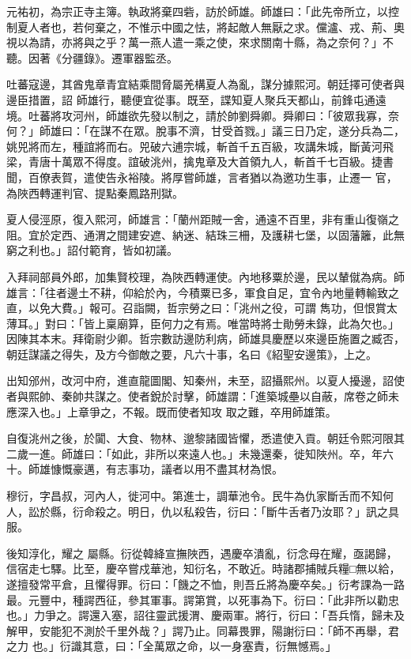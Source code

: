 \begin{pinyinscope}
 元祐初，為宗正寺主簿。執政將棄四砦，訪於師雄。師雄曰：「此先帝所立，以控制夏人者也，若何棄之，不惟示中國之怯，將起敵人無厭之求。儻瀘、戎、荊、奧視以為請，亦將與之乎？萬一燕人遣一乘之使，來求關南十縣，為之奈何？」不聽。因著《分疆錄》。遷軍器監丞。



 吐蕃寇邊，其酋鬼章青宜結乘間脅屬羌構夏人為亂，謀分據熙河。朝廷擇可使者與邊臣措置，詔
 師雄行，聽便宜從事。既至，諜知夏人聚兵天都山，前鋒屯通遠境。吐蕃將攻河州，師雄欲先發以制之，請於帥劉舜卿。舜卿曰：「彼眾我寡，奈何？」師雄曰：「在謀不在眾。脫事不濟，甘受首戮。」議三日乃定，遂分兵為二，姚兕將而左，種誼將而右。兕破六逋宗城，斬首千五百級，攻講朱城，斷黃河飛梁，青唐十萬眾不得度。誼破洮州，擒鬼章及大首領九人，斬首千七百級。捷書聞，百僚表賀，遣使告永裕陵。將厚嘗師雄，言者猶以為邀功生事，止遷一
 官，為陜西轉運判官、提點秦鳳路刑獄。



 夏人侵涇原，復入熙河，師雄言：「蘭州距賊一舍，通遠不百里，非有重山復嶺之阻。宜於定西、通渭之間建安遮、納迷、結珠三柵，及護耕七堡，以固藩籬，此無窮之利也。」詔付範育，皆如初議。



 入拜祠部員外郎，加集賢校理，為陜西轉運使。內地移粟於邊，民以輦僦為病。師雄言：「往者邊土不耕，仰給於內，今積粟已多，軍食自足，宜令內地量轉輸致之直，以免大費。」報可。召詣闕，哲宗勞之曰：「洮州之役，可謂
 雋功，但恨賞太薄耳。」對曰：「皆上稟廟算，臣何力之有焉。唯當時將士勛勞未錄，此為欠也。」因陳其本末。拜衛尉少卿。哲宗數訪邊防利病，師雄具慶歷以來邊臣施置之臧否，朝廷謀議之得失，及方今御敵之要，凡六十事，名曰《紹聖安邊策》，上之。



 出知邠州，改河中府，進直龍圖閣、知秦州，未至，詔攝熙州。以夏人擾邊，詔使者與熙帥、秦帥共謀之。使者銳於討擊，師雄謂：「進築城壘以自蔽，席卷之師未應深入也。」上章爭之，不報。既而使者知攻
 取之難，卒用師雄策。



 自復洮州之後，於闐、大食、物林、邈黎諸國皆懼，悉遣使入貢。朝廷令熙河限其二歲一進。師雄曰：「如此，非所以來遠人也。」未幾還秦，徙知陜州。卒，年六十。師雄慷慨豪邁，有志事功，議者以用不盡其材為恨。



 穆衍，字昌叔，河內人，徙河中。第進士，調華池令。民牛為仇家斷舌而不知何人，訟於縣，衍命殺之。明日，仇以私殺告，衍曰：「斷牛舌者乃汝耶？」訊之具服。



 後知淳化，耀之
 屬縣。衍從韓絳宣撫陜西，遇慶卒潰亂，衍念母在耀，亟謁歸，信宿走七驛。比至，慶卒嘗戍華池，知衍名，不敢近。時諸郡捕賊兵糧□無以給，遂擅發常平倉，且懼得罪。衍曰：「饑之不恤，則吾丘將為慶卒矣。」衍考課為一路最。元豐中，種諤西征，參其軍事。諤第賞，以死事為下。衍曰：「此非所以勸忠也。」力爭之。諤還入塞，詔往靈武援渭、慶兩軍。將行，衍曰：「吾兵惰，歸未及解甲，安能犯不測於千里外哉？」諤乃止。同幕畏罪，陽謝衍曰：「師不再舉，君之力
 也。」衍識其意，曰：「全萬眾之命，以一身塞責，衍無憾焉。」




\end{pinyinscope}

